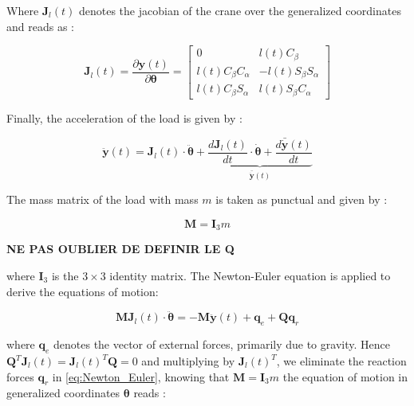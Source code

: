 Where \( \boldsymbol{J}_{l}(t)\) denotes the jacobian of the crane over the generalized coordinates and reads as : 

\begin{equation}
     \boldsymbol{J}_{l}(t) = \frac{\partial \boldsymbol{y}(t)}{\partial \boldsymbol{\theta}} = \begin{bmatrix}
         0                       & l(t)C_\beta \\
         l(t)C_\beta C_\alpha    & -l(t)S_\beta S_\alpha \\
         l(t)C_\beta S_\alpha    & l(t)S_\beta C_\alpha
     \end{bmatrix}
\end{equation}

Finally, the acceleration of the load is given by : 

\begin{equation}
    \ddot{\boldsymbol{y}}(t) = \boldsymbol{J}_{l}(t) \cdot \ddot{\boldsymbol{\theta}} + \underbrace{\frac{d\boldsymbol{J}_{l}(t)}{dt} \cdot \dot{\boldsymbol{\theta}} + \frac{d\bar{\dot{\boldsymbol{y}}}(t)}{dt}}_{\bar{\ddot{\boldsymbol{y}}}(t)}
\end{equation}

The mass matrix of the load with mass \(m\) is taken as punctual and given by :

\begin{equation}
    \boldsymbol{M} = \boldsymbol{I}_3 m
\end{equation}

\textbf{NE PAS OUBLIER DE DEFINIR LE Q}

where \(\boldsymbol{I}_3\) is the \(3 \times 3\) identity matrix. The Newton-Euler equation is applied to derive the equations of motion:

\begin{equation}  
\label{eq:Newton_Euler}
\boldsymbol{M} \boldsymbol{J}_{l}(t) \cdot \ddot{\boldsymbol{\theta}} = -\boldsymbol{M} \ddot{\boldsymbol{y}}(t) + \boldsymbol{q}_{e} + \boldsymbol{Q} \boldsymbol{q}_{r}
\end{equation}

where \(\boldsymbol{q}_{e}\) denotes the vector of external forces, primarily due to gravity. Hence \(\boldsymbol{Q}^T\boldsymbol{J}_{l}(t) = \boldsymbol{J}_{l}(t)^T\boldsymbol{Q}= 0\) and multiplying by \( \boldsymbol{J}_{l}(t)^T\), we eliminate the reaction forces \(\boldsymbol{q}_r\) in \ref{eq:Newton_Euler}, knowing that \(\boldsymbol{M} = \boldsymbol{I}_3m\) the equation of motion in generalized coordinates \(\boldsymbol{\theta}\) reads :

